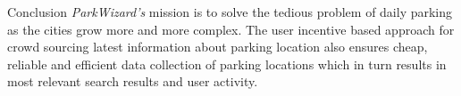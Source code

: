 \documentclass[final]{beamer}
\newlength{\onecolwid}
\begin{document}
\begin{frame}[t]
\begin{columns}[t]
\begin{column}{\onecolwid}


\begin{alertblock}{Conclusion}
\fontsize{34}{40} \selectfont \textit{ParkWizard's} mission is to solve the tedious problem of daily parking as the cities grow more and more complex. The user incentive based approach for crowd sourcing latest information about parking location also ensures cheap, reliable and efficient data collection of parking locations which in turn results in most relevant search results and user activity.
\end{alertblock}

\end{column} %

\end{columns} %

\end{frame} %
\end{document}
